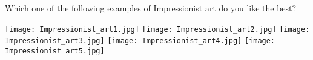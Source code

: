 
\begin{tcolorbox}
Which one of the following examples of Impressionist art do you like the best?

\texttt{[image: Impressionist\_art1.jpg]}
\texttt{[image: Impressionist\_art2.jpg]}
\texttt{[image: Impressionist\_art3.jpg]}
\texttt{[image: Impressionist\_art4.jpg]}
\texttt{[image: Impressionist\_art5.jpg]}
\end{tcolorbox}
